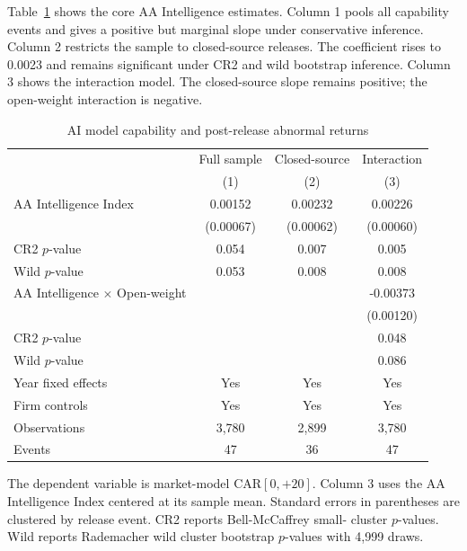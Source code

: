 \documentclass[12pt]{article}
\begin{document}
Table~\ref{tab:main} shows the core AA Intelligence estimates. Column 1 pools all capability
events and gives a positive but marginal slope under conservative inference.
Column 2 restricts the sample to closed-source releases. The coefficient rises to
0.0023 and remains significant under CR2 and wild bootstrap inference. Column 3
shows the interaction model. The closed-source slope remains positive; the
open-weight interaction is negative.

\begin{table}[htbp]
\centering
\caption{AI model capability and post-release abnormal returns}
\label{tab:main}
\begin{threeparttable}
\begin{tabular}{lccc}
\toprule
 & Full sample & Closed-source & Interaction \\
 & (1) & (2) & (3) \\
\midrule
AA Intelligence Index & 0.00152 & 0.00232 & 0.00226 \\
 & (0.00067) & (0.00062) & (0.00060) \\
CR2 $p$-value & 0.054 & 0.007 & 0.005 \\
Wild $p$-value & 0.053 & 0.008 & 0.008 \\
\addlinespace
AA Intelligence $\times$ Open-weight &  &  & -0.00373 \\
 &  &  & (0.00120) \\
CR2 $p$-value &  &  & 0.048 \\
Wild $p$-value &  &  & 0.086 \\
\addlinespace
Year fixed effects & Yes & Yes & Yes \\
Firm controls & Yes & Yes & Yes \\
Observations & 3,780 & 2,899 & 3,780 \\
Events & 47 & 36 & 47 \\
\bottomrule
\end{tabular}
\begin{tablenotes}[flushleft]\footnotesize
\item The dependent variable is market-model CAR$[0,{+}20]$. Column 3 uses the
AA Intelligence Index centered at its sample mean. Standard errors in
parentheses are clustered by release event. CR2 reports Bell-McCaffrey small-
cluster $p$-values. Wild reports Rademacher wild cluster bootstrap $p$-values
with 4,999 draws.
\end{tablenotes}
\end{threeparttable}
\end{table}
\end{document}

